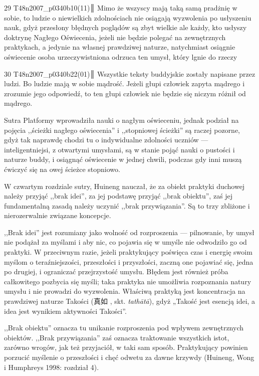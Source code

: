 29 T48n2007_p0340b10(11)║
Mimo że wszyscy mają taką samą pradżnię w sobie, to ludzie o niewielkich zdolnościach nie osiągają wyzwolenia po usłyszeniu nauk, gdyż przesłony błędnych poglądów są zbyt wielkie
ale każdy, kto usłyszy doktrynę Nagłego Oświecenia, jeżeli nie będzie polegać na zewnętrznych praktykach, a jedynie na własnej prawdziwej naturze, natychmiast osiągnie oświecenie
osoba urzeczywistniona odrzuca ten umysł, który lgnie do rzeczy

30 T48n2007_p0340b22(01)║
Wszystkie teksty buddyjskie zostały napisane przez ludzi. Bo ludzie mają w sobie mądrość. Jeżeli głupi człowiek zapyta mądrego i zrozumie jego odpowiedź, to ten głupi człowiek nie będzie się niczym różnił od mądrego.

\fi

Sutra Platformy wprowadziła nauki o nagłym oświeceniu, jednak podział na pojęcia ,,ścieżki nagłego oświecenia'' i ,,stopniowej ścieżki'' są raczej pozorne, gdyż tak naprawdę chodzi tu o indywidualne zdolności uczniów --- inteligentniejsi, z otwartymi umysłami, są w stanie pojąć nauki o pustości i naturze buddy, i osiągnąć oświecenie w jednej chwili, podczas gdy inni muszą ćwiczyć się na owej ścieżce stopniowo.

W czwartym rozdziale sutry, Huineng nauczał, że za obiekt praktyki duchowej należy przyjąć ,,brak idei'', za jej podstawę przyjąć ,,brak obiektu'', zaś jej fundamentalną zasadą należy uczynić ,,brak przywiązania''. Są to trzy zbliżone i nierozerwalnie związane koncepcje.

,,Brak idei'' jest rozumiany jako wolność od rozproszenia --- pilnowanie, by umysł nie podążał za myślami i aby nic, co pojawia się w umyśle nie odwodziło go od praktyki. W przeciwnym razie, jeżeli praktykujący poświęca czas i energię swoim myślom o teraźniejszości, przeszłości i przyszłości, zaczną one pojawiać się, jedna po drugiej, i ograniczać przejrzystość umysłu. Błędem jest również próba całkowitego pozbycia się myśli; taka praktyka nie umożliwia rozpoznania natury umysłu i nie prowadzi do wyzwolenia. Właściwą praktyką jest koncentracja na prawdziwej naturze Takości (真如 , skt. \textit{tathātā}), gdyż „Takość jest esencją idei, a idea jest wynikiem aktywności Takości”.

,,Brak obiektu'' oznacza tu unikanie rozproszenia pod wpływem zewnętrznych obiektów. ,,Brak przywiązania'' zaś oznacza traktowanie wszystkich istot, zarówno wrogów, jak też przyjaciół, w taki sam sposób. Praktykujący powinien porzucić myślenie o przeszłości i chęć odwetu za dawne krzywdy (Huineng, Wong i Humphreys 1998: rozdział 4).

